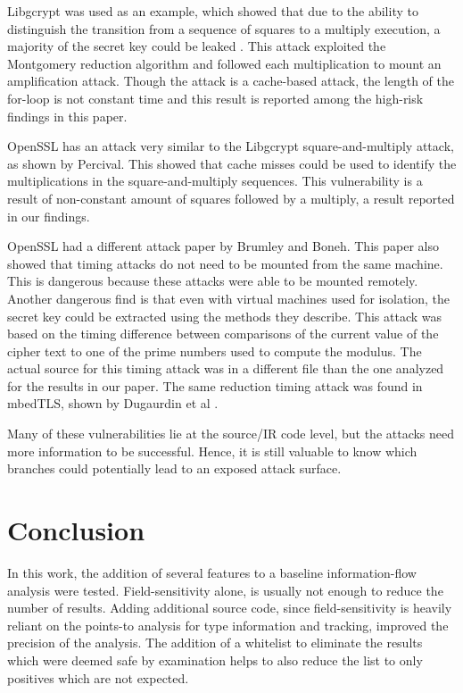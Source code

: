    Libgcrypt was used as an example, which showed that due to the ability to
   distinguish the transition from a sequence of squares to a multiply
   execution, a majority of the secret key could be leaked
   \cite{bernstein2017sliding}. This attack exploited the Montgomery reduction
   algorithm and followed each multiplication to mount an amplification
   attack. Though the attack is a cache-based attack, the length of the for-loop
   is not constant time and this result is reported among the high-risk findings
   in this paper.

   OpenSSL has an attack very similar to the Libgcrypt square-and-multiply
   attack, as shown by Percival\cite{percival2005cache}. This showed that
   cache misses could be used to identify the multiplications in the
   square-and-multiply sequences. This vulnerability is a result of non-constant
   amount of squares followed by a multiply, a result reported in our findings.

   OpenSSL had a different attack paper by Brumley and
   Boneh\cite{brumley2005remote}. This paper also showed that timing attacks do
   not need to be mounted from the same machine. This is dangerous because these
   attacks were able to be mounted remotely. Another dangerous find is that even
   with virtual machines used for isolation, the secret key could be extracted
   using the methods they describe. This attack was based on the timing difference
   between comparisons of the current value of the cipher text to one of the prime
   numbers used to compute the modulus. The actual source for this timing attack
   was in a different file than the one analyzed for the results in our paper.
   The same reduction timing attack was found in mbedTLS, shown by Dugaurdin et
   al \cite{mbedtlsreductions,kochertiming}.

   Many of these vulnerabilities lie at the source/IR code level, but the
   attacks need more information to be successful. Hence, it is still valuable
   to know which branches could potentially lead to an exposed attack surface.

\section{Conclusion}
   In this work, the addition of several features to a baseline information-flow
   analysis were tested. Field-sensitivity alone, is usually not enough to
   reduce the number of results. Adding additional source code, since
   field-sensitivity is heavily reliant on the points-to analysis for type
   information and tracking, improved the precision of the analysis. The
   addition of a whitelist to eliminate the results which were deemed safe by
   examination helps to also reduce the list to only positives which are
   not expected.

